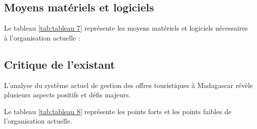 \documentclass[12pt]{report}
\begin{document}
				\subsection{Moyens matériels et logiciels}
				\hspace{15pt} Le tableau \ref{tab:tableau 7} représente les moyens matériels et logiciels nécessaires à l'organisation actuelle :
				\begin{table}[h]
				  \centering
				  \caption{Moyens matériels et logiciels de l'organisation actuelle}
				  \label{tab:tableau 7}
				\end{table}
			
				\subsection{Critique de l'existant}

				\hspace{15pt} L'analyse du système actuel de gestion des offres touristiques à Madagascar révèle plusieurs aspects positifs et défis majeurs.
				
				Le tableau \ref{tab:tableau 8} représente les points forts et les points faibles de l'organisation actuelle.
		
\end{document}
